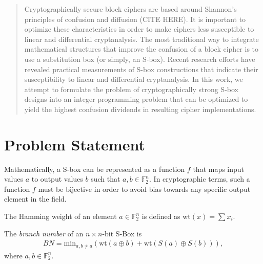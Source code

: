 \documentclass[11pt]{article}
\newcommand{\field}[1]{\mathbb{#1}} %
\begin{document}

\begin{abstract}
Cryptographically secure block ciphers are based around Shannon's principles of confusion and diffusion (CITE HERE). It is important to optimize these characteristics in order to make ciphers less susceptible to linear and differential cryptanalysis. The most traditional way to integrate mathematical structures that improve the confusion of a block cipher is to use a substitution box  (or simply, an S-box). Recent research efforts have revealed practical measurements of S-box constructions that indicate their susceptibility to linear and differential cryptanalysis. In this work, we attempt to formulate the problem of cryptographically strong S-box designs into an integer programming problem that can be optimized to yield the highest confusion dividends in resulting cipher implementations.
\end{abstract}

\section{Problem Statement}

Mathematically, a S-box can be represented as a function $f$ that maps input values $a$ to output values $b$ such that $a,b \in \field{F}_2^n$. In cryptographic terms, such a function $f$ must be bijective in order to avoid bias towards any specific output element in the field. 


\begin{define}
The Hamming weight of an element $a \in \field{F}_2^n$ is defined as wt$(x) = \sum x_i$.
\end{define}


\begin{define}
The \emph{branch number} of an $n \times n$-bit S-Box is
\begin{eqnarray*}
BN = \text{min}_{a, b\not=a}(\text{wt}(a \oplus b) + \text{wt}(S(a) \oplus S(b))),
\end{eqnarray*}
where $a, b \in \field{F}_2^n$.
\end{define}
\end{document}
